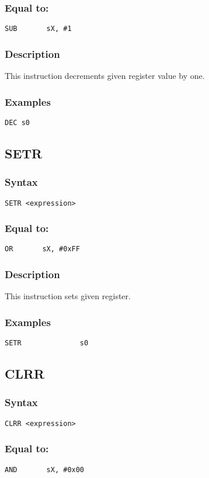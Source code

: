         \subsubsection{Equal to:}
            \verb'SUB       sX, #1'

        \subsubsection{Description}
            This instruction decrements given register value by one.

        \subsubsection{Examples}
            \verb'DEC s0'

    \subsection{SETR}
        \subsubsection{Syntax}
            \verb'SETR <expression>'

        \subsubsection{Equal to:}
            \verb'OR       sX, #0xFF'

        \subsubsection{Description}
            This instruction sets given register.

        \subsubsection{Examples}
            \verb'SETR              s0'

    \subsection{CLRR}
        \subsubsection{Syntax}
            \verb'CLRR <expression>'

        \subsubsection{Equal to:}
            \verb'AND       sX, #0x00'

